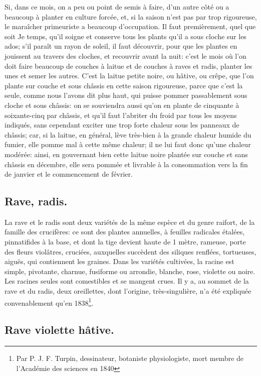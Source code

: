 \documentclass[10pt,a4paper]{book}
\begin{document}
Si, dans ce mois, on a peu ou point de semis à faire, d'un autre côté ou a beaucoup à planter en culture forcée, et, si la saison n'est pas par trop rigoureuse, le maraîcher primeuriste a beaucoup d'occupation. Il faut premièrement, quel que soit Je temps, qu'il soigne et conserve tous les plants qu'il a sous cloche sur les ados; s'il paraît un rayon de soleil, il faut découvrir, pour que les plantes en jouissent au travers des cloches, et recouvrir avant la nuit: c'est le mois où l'on doit faire beaucoup de couches à laitue et de couches à raves et radis, planter les unes et semer les autres. C'est la laitue petite noire, ou hâtive, ou crêpe, que l'on plante sur couche et sous châssis en cette saison rigoureuse, parce que c'est la seule, comme nous l'avons dit plus haut, qui puisse pommer passablement sous cloche et sous châssis: on se souviendra aussi qu'on en plante de cinquante à soixante-cinq par châssis, et qu'il faut l'abriter du froid par tous les moyens indiqués, sans cependant exciter une trop forte chaleur sous les panneaux de châssis; car, si la laitue, en général, lève très-bien à la grande chaleur humide du fumier, elle pomme mal à cette même chaleur; il ne lui faut donc qu'une chaleur modérée: ainsi, en gouvernant bien cette laitue noire plantée sur couche et sans châssis en décembre, elle sera pommée et livrable à la consommation vers la fin de janvier et le commencement de février.

\subsection{Rave, radis.}

La rave et le radis sont deux variétés de la même espèce et du genre raifort, de la famille des crucifères: ce sont des plantes annuelles, à feuilles radicales étalées, pinnatifides à la base, et dont la tige devient haute de 1 mètre, rameuse, porte des fleurs violâtres, cruciées, auxquelles succèdent des siliques renflées, tortueuses, aiguës, qui contiennent les graines. Dans les variétés cultivées, la racine est simple, pivotante, charnue, fusiforme ou arrondie, blanche, rose, violette ou noire. Les racines seules sont comestibles et se mangent crues. Il y a, au sommet de la rave et du radis, deux oreillettes, dont l'origine, très-singulière, n'a été expliquée convenablement qu'en 1838\footnote{Par P. J. F. Turpin, dessinateur, botaniste physiologiste, mort membre de l'Académie des sciences en 1840}.

\subsection{Rave violette hâtive.}
\end{document}
